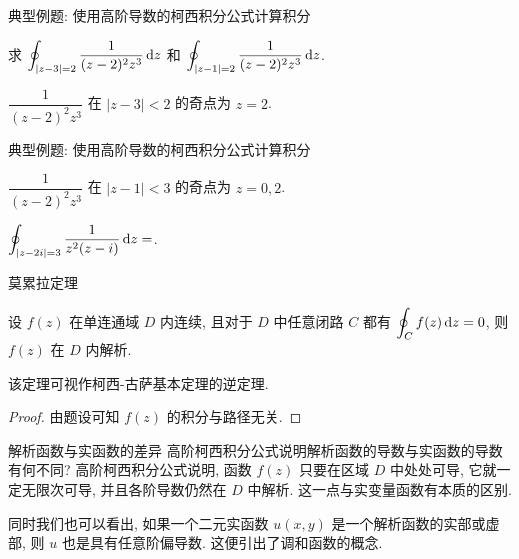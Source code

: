 \begin{frame}{典型例题: 使用高阶导数的柯西积分公式计算积分}
\onslide<+->
\begin{example}
求 $\displaystyle\oint_{|z-3|=2}\frac1{(z-2)^2z^3}\,\mathrm{d} z$ 和 $\displaystyle\oint_{|z-1|=2}\frac1{(z-2)^2z^3}\,\mathrm{d} z$.
\end{example}
\onslide<+->
\begin{solution}
 $\dfrac1{(z-2)^2z^3}$ 在 $|z-3|<2$ 的奇点为 $z=2$.
\onslide<+->{由柯西积分公式,
\[\oint_{|z-3|=2}\frac1{(z-2)^2z^3}\diff z
	=\frac{2\pi i}{1!}\left(\frac1{z^3}\right)'\bigg|_{z=2}
	=-\frac{3\pi i}8.\]}
\end{solution}
\end{frame}


\begin{frame}[<*>]{典型例题: 使用高阶导数的柯西积分公式计算积分}
\onslide<+->
\begin{solutionc}
 $\dfrac1{(z-2)^2z^3}$ 在 $|z-1|<3$ 的奇点为 $z=0,2$.
\end{solutionc}
\onslide<+->
\begin{exercise}
$\displaystyle\oint_{|z-2i|=3}\frac1{z^2(z-i)}\,\mathrm{d} z=$.
\end{exercise}
\end{frame}


\begin{frame}{莫累拉定理}
\onslide<+->
\begin{example}[莫累拉定理]
设 $f(z)$ 在单连通域 $D$ 内连续, 且对于 $D$ 中任意闭路 $C$ 都有 $\displaystyle\oint_Cf(z)\,\mathrm{d} z=0$, 则 $f(z)$ 在 $D$ 内解析.
\end{example}
\onslide<+->
该定理可视作柯西-古萨基本定理的逆定理.
\onslide<+->
\begin{proof}
由题设可知 $f(z)$ 的积分与路径无关.
\end{proof}
\end{frame}


\begin{frame}{解析函数与实函数的差异}
\onslide<+->
高阶柯西积分公式说明解析函数的导数与实函数的导数有何不同?
\onslide<+->
高阶柯西积分公式说明, 函数 $f(z)$ 只要在区域 $D$ 中处处可导, 它就一定无限次可导, 并且各阶导数仍然在 $D$ 中解析.
\onslide<+->
\alert{这一点与实变量函数有本质的区别.}

\onslide<+->
同时我们也可以看出, 如果一个二元实函数 $u(x,y)$ 是一个解析函数的实部或虚部, 则 $u$ 也是具有任意阶偏导数.
\onslide<+->
这便引出了调和函数的概念.
\end{frame}


